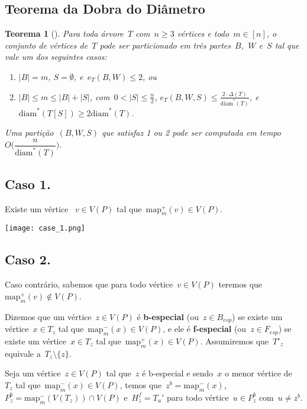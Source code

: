 \documentclass[a0,portrait]{a0poster}
\newtheorem{teo}{Teorema}
\newcommand{\diam}{\mathrm{diam}}
\newcommand{\map}{\mathrm{map}}
\begin{document}
\begin{multicols}{3}
\section*{Teorema da Dobra do Diâmetro}

\begin{teo}[]
    Para toda árvore~$T$ com~${n\ge 3}$ vértices e 
    todo~${m\in [n]}$,
    o conjunto de vértices de~$T$ pode ser particionado em 
    três partes~$B$,~$W$ e~$S$ tal que vale um dos 
    seguintes casos:
    \begin{enumerate}
    \item ${|B|=m}$, ${S=\emptyset}$, e~${e_T(B,W)\le 2}$, ou
    \item ${|B|\le m\le |B|+|S|}$, 
    com~${0<|S|\le\frac{n}{2}}$,
    ${e_T(B,W,S)\le \frac{2\cdot 
    \Delta(T)}{\diam^*(T)}}$, 
    e~${\diam^*(T[S])\ge 2\diam^*(T)}$.
    \end{enumerate}
    Uma partição~$(B,W,S)$ que satisfaz 1 ou 2 pode ser
    computada em tempo~${O\Big(\dfrac{n}{\diam^*(T)}\Big)}$.
\end{teo}


\subsection*{Caso 1.}
    Existe um vértice ~${v\in V(P)}$ tal 
    que~${\map_m^+(v)\in V(P)}$.
\begin{center}
\texttt{[image: case\_1.png]}
\end{center}

\subsection*{Caso 2.}
    Caso contrário, sabemos que para todo vértice~${v\in V(P)}$
    teremos que~${\map_m^+(v)\not\in V(P)}$.

    Dizemos que um vértice~${z\in V(P)}$ é \textbf{b-especial}
    (ou~${z\in B_{esp}}$)
    se existe um vértice~${x\in T_z}$ tal 
    que~${\map^{-}_m(x)\in V(P)}$, e ele é
    \textbf{f-especial} (ou~${z\in F_{esp}}$) 
    se existe um vértice~${x\in T_z}$
    tal que~${\map^{+}_m(x)\in V(P)}$.
    Assumiremos que~$T'_z$ equivale a~$T_z\setminus \{z\}$.

    \bigskip
    \bigskip

    Seja um vértice~${z\in V(P)}$ tal que~$z$ é b-especial e
    sendo~$x$ o menor vértice de~$T_z$ tal 
    que~${\map^-_m(x)\in V(P)}$, temos 
    que~${z^b = \map^-_m(x)}$,
    ~${P_z^b = \map^-_m(V(T_z))\cap V(P)}$
    e~${H_z^f =T_u'}$ para todo 
    vértice~${u\in P_z^b}$ com~${u\ne z^b}$.


\end{multicols}
\end{document}
